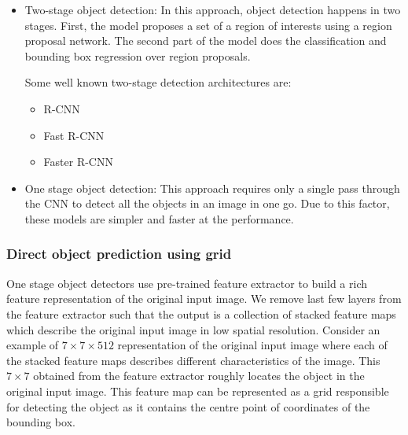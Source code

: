 \begin{itemize}

\item{Two-stage object detection}: In this approach, object detection happens in two stages. First, the model proposes a set of a region of interests using a region proposal network. The second part of the model does the classification and bounding box regression over region proposals.

\par

Some well known two-stage detection architectures are:

\begin{itemize}
    \item R-CNN
    \item Fast R-CNN
    \item Faster R-CNN
\end{itemize}

\item{One stage object detection}: This approach requires only a single pass through the CNN to detect all the objects in an image in one go. Due to this factor, these models are simpler and faster at the performance. 

\end{itemize}

\subsubsection{Direct object prediction using grid}



One stage object detectors use pre-trained feature extractor to build a rich feature representation of the original input image. We remove last few layers from the feature extractor such that the output is a collection of stacked feature maps which describe the original input image in low spatial resolution. Consider an example of $7\times7\times512$ representation of the original input image where each of the stacked feature maps describes different characteristics of the image. This $7\times7$ obtained from the feature extractor roughly locates the object in the original input image. This feature map can be represented as a grid responsible for detecting the object as it contains the centre point of coordinates of the bounding box. 

